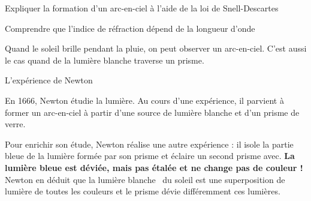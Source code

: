 \sndEnTeteQuatre
\vspace*{-40pt}



\vspace*{-12pt}
\begin{objectifs}
  \item Expliquer la formation d'un arc-en-ciel à l'aide de la loi de Snell-Descartes
  \item Comprendre que l'indice de réfraction dépend de la longueur d'onde
\end{objectifs}

\begin{contexte}
  Quand le soleil brille pendant la pluie, on peut observer un arc-en-ciel.
  C'est aussi le cas quand de la lumière blanche traverse un prisme.
  
\end{contexte}


\begin{doc}{L'expérience de Newton}
  \label{doc:exp_newton}
  
  \vspace*{-16pt}
  En 1666, Newton étudie la lumière.
  Au cours d'une expérience, il parvient à former un arc-en-ciel à partir d'une source de lumière blanche et d'un prisme de verre.
 
  Pour enrichir son étude, Newton réalise une autre expérience : il isole la partie bleue de la lumière formée par son prisme et éclaire un second prisme avec.
  \textbf{La lumière bleue est déviée, mais pas étalée et ne change pas de couleur !}
  Newton en déduit que la lumière \og blanche \fg\, du soleil est une superposition de lumière de toutes les couleurs et le prisme dévie différemment ces lumières.
  
  \vspace*{-8pt}
  \begin{center}
  \end{center}
\end{doc}

